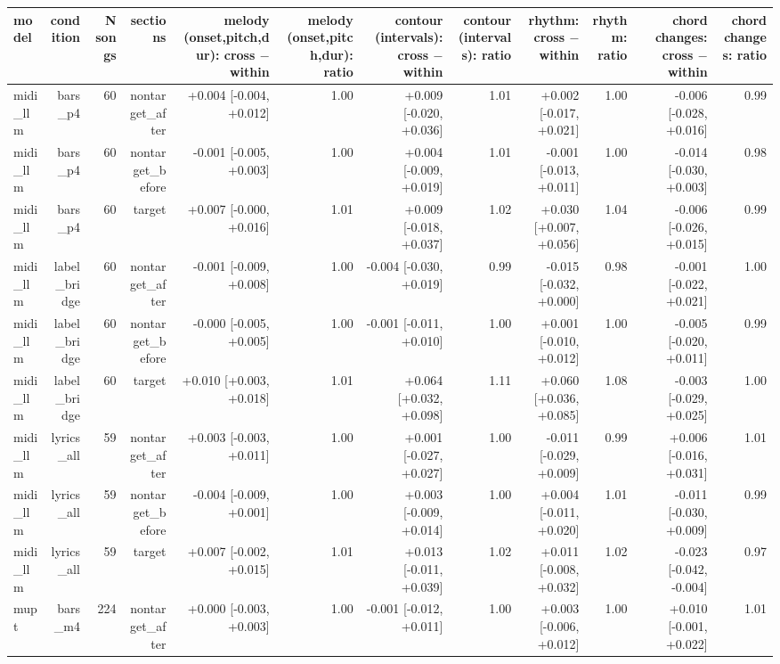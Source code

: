 \begin{table}[t]
\centering
\small
\begin{tabular}{lrrrrrrrrrrr}
\toprule
model & condition & N songs & sections & melody (onset,pitch,dur): cross $-$ within & melody (onset,pitch,dur): ratio & contour (intervals): cross $-$ within & contour (intervals): ratio & rhythm: cross $-$ within & rhythm: ratio & chord changes: cross $-$ within & chord changes: ratio \\
\midrule
midi\_llm & bars\_p4 & 60 & nontarget\_after & +0.004 [-0.004, +0.012] & 1.00 & +0.009 [-0.020, +0.036] & 1.01 & +0.002 [-0.017, +0.021] & 1.00 & -0.006 [-0.028, +0.016] & 0.99 \\
midi\_llm & bars\_p4 & 60 & nontarget\_before & -0.001 [-0.005, +0.003] & 1.00 & +0.004 [-0.009, +0.019] & 1.01 & -0.001 [-0.013, +0.011] & 1.00 & -0.014 [-0.030, +0.003] & 0.98 \\
midi\_llm & bars\_p4 & 60 & target & +0.007 [-0.000, +0.016] & 1.01 & +0.009 [-0.018, +0.037] & 1.02 & +0.030 [+0.007, +0.056] & 1.04 & -0.006 [-0.026, +0.015] & 0.99 \\
midi\_llm & label\_bridge & 60 & nontarget\_after & -0.001 [-0.009, +0.008] & 1.00 & -0.004 [-0.030, +0.019] & 0.99 & -0.015 [-0.032, +0.000] & 0.98 & -0.001 [-0.022, +0.021] & 1.00 \\
midi\_llm & label\_bridge & 60 & nontarget\_before & -0.000 [-0.005, +0.005] & 1.00 & -0.001 [-0.011, +0.010] & 1.00 & +0.001 [-0.010, +0.012] & 1.00 & -0.005 [-0.020, +0.011] & 0.99 \\
midi\_llm & label\_bridge & 60 & target & +0.010 [+0.003, +0.018] & 1.01 & +0.064 [+0.032, +0.098] & 1.11 & +0.060 [+0.036, +0.085] & 1.08 & -0.003 [-0.029, +0.025] & 1.00 \\
midi\_llm & lyrics\_all & 59 & nontarget\_after & +0.003 [-0.003, +0.011] & 1.00 & +0.001 [-0.027, +0.027] & 1.00 & -0.011 [-0.029, +0.009] & 0.99 & +0.006 [-0.016, +0.031] & 1.01 \\
midi\_llm & lyrics\_all & 59 & nontarget\_before & -0.004 [-0.009, +0.001] & 1.00 & +0.003 [-0.009, +0.014] & 1.00 & +0.004 [-0.011, +0.020] & 1.01 & -0.011 [-0.030, +0.009] & 0.99 \\
midi\_llm & lyrics\_all & 59 & target & +0.007 [-0.002, +0.015] & 1.01 & +0.013 [-0.011, +0.039] & 1.02 & +0.011 [-0.008, +0.032] & 1.02 & -0.023 [-0.042, -0.004] & 0.97 \\
mupt & bars\_m4 & 224 & nontarget\_after & +0.000 [-0.003, +0.003] & 1.00 & -0.001 [-0.012, +0.011] & 1.00 & +0.003 [-0.006, +0.012] & 1.00 & +0.010 [-0.001, +0.022] & 1.01 \\

\end{tabular}
\end{table}
